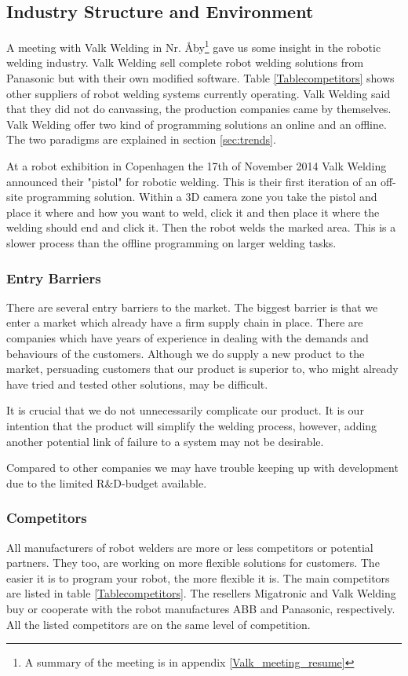 \subsection{Industry Structure and Environment}
\label{ind.struc}
A meeting with Valk Welding in Nr. Åby\footnote{A summary of the meeting is in appendix \ref{Valk_meeting_resume}} gave us some insight in the robotic welding industry. 
Valk Welding sell complete robot welding solutions from Panasonic but with their own modified software. 
Table \ref{Tablecompetitors} shows other suppliers of robot welding systems currently operating. 
Valk Welding said that they did not do canvassing, the production companies came by themselves. 
Valk Welding offer two kind of programming solutions an online and an offline. The two paradigms are explained in section \ref{sec:trends}.

At a robot exhibition in Copenhagen the 17th of November 2014 Valk Welding announced their "pistol" for robotic welding. This is their first iteration of an off-site programming solution. Within a 3D camera zone you take the pistol and place it where and how you want to weld, click it and then place it where the welding should end and click it. Then the robot welds the marked area. This is a slower process than the offline programming on larger welding tasks.
\subsubsection{Entry Barriers}
There are several entry barriers to the market. The biggest barrier is that we enter a market which already have a firm supply chain in place. There are companies which have years of experience in dealing with the demands and behaviours of the customers. Although we do supply a new product to the market, persuading customers that our product is superior to, who might already have tried and tested other solutions, may be difficult.

It is crucial that we do not unnecessarily complicate our product. 
It is our intention that the product will simplify the welding process, however, adding another potential link of failure to a system may not be desirable.

Compared to other companies we may have trouble keeping up with development due to the limited R\&D-budget available.
\subsubsection{Competitors}
\label{competitors}
All manufacturers of robot welders are more or less competitors or potential partners. They too, are working on more flexible solutions for customers. The easier it is to program your robot, the more flexible it is. The main competitors are listed in table \ref{Tablecompetitors}. The resellers Migatronic and Valk Welding buy or cooperate with the robot manufactures ABB and Panasonic, respectively. All the listed competitors are on the same level of competition.

